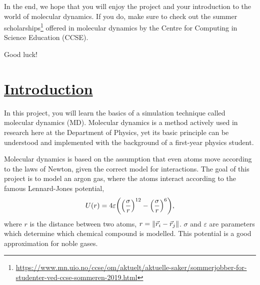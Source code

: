 \documentclass[11pt,british,a4paper]{report}
\begin{document}
In the end, we hope that you will enjoy the project and your introduction to the world of molecular dynamics. If you do, make sure to check out the summer scholarships\footnote{\url{https://www.mn.uio.no/ccse/om/aktuelt/aktuelle-saker/sommerjobber-for-studenter-ved-ccse-sommeren-2019.html}} offered in molecular dynamics by the Centre for Computing in Science Education (CCSE).

Good luck!


\clearpage

\section{\underline{Introduction}}
In this project, you will learn the basics of a simulation technique called molecular dynamics (MD). Molecular dynamics is a method actively used in research here at the Department of Physics, yet its basic principle can be understood and implemented with the background of a first-year physics student.

Molecular dynamics is based on the assumption that even atoms move according to the laws of Newton, given the correct model for interactions. The goal of this project is to model an argon gas, where the atoms interact according to the famous Lennard-Jones potential,
\begin{equation}
    U(r) = 4\varepsilon\qty(\qty(\frac{\sigma}{r})^{12} - \qty(\frac{\sigma}{r})^6), \label{eq:lj}
\end{equation}
where \(r\) is the distance between two atoms, \(r=\norm{\vec{r}_i-\vec{r}_j}\). \(\sigma\) and \(\varepsilon\) are parameters which determine which chemical compound is modelled. This potential is a good approximation for noble gases.
\end{document}
